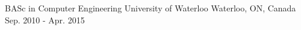 

\begin{cventries}

  \cventrynodescription
    {BASc in Computer Engineering} %
    {University of Waterloo} %
    {Waterloo, ON, Canada} %
    {Sep. 2010 - Apr. 2015} %

\end{cventries}
